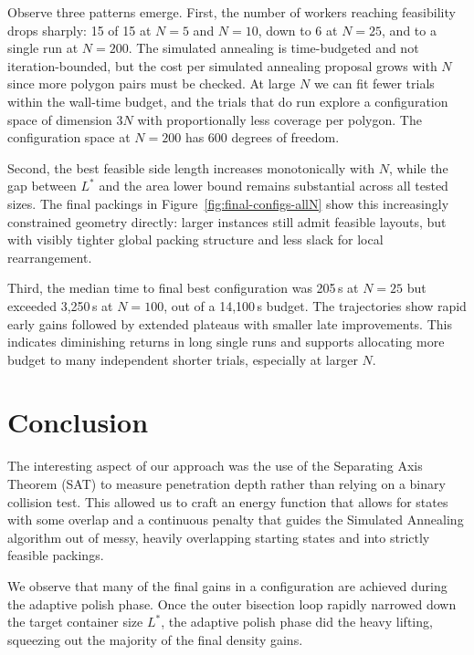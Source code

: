 \documentclass[10pt]{article}
\begin{document}
Observe three patterns emerge. First, the number of workers reaching
feasibility drops sharply: 15 of 15 at $N = 5$ and $N = 10$, down to
6 at $N = 25$, and to a single run at $N = 200$. The simulated annealing is
time-budgeted and not iteration-bounded, but the cost per simulated annealing proposal
grows with $N$ since more polygon pairs must be checked. At large
$N$ we can fit fewer trials within the wall-time budget, and the trials that
do run explore a configuration space of dimension $3N$ with
proportionally less coverage per polygon. The configuration space at
$N = 200$ has 600 degrees of freedom.

Second, the best feasible side length increases monotonically with
$N$, while the gap between $L^*$ and the area lower bound remains substantial across all tested
sizes. The final packings in Figure~\ref{fig:final-configs-allN}
show this increasingly constrained geometry directly: larger instances
still admit feasible layouts, but with visibly tighter global packing
structure and less slack for local rearrangement.

Third, the median time to final best configuration was 205\,s at
$N = 25$ but exceeded 3{,}250\,s at $N = 100$, out of a 14{,}100\,s
budget. The trajectories show rapid early gains followed by extended
plateaus with smaller late improvements. This indicates diminishing
returns in long single runs and supports allocating more budget to many
independent shorter trials, especially at larger $N$.


\clearpage

\section{Conclusion}
\label{sec:conclusion}

The interesting aspect of our approach was the use of 
the Separating Axis Theorem (SAT) to measure penetration depth rather
than relying on a binary collision test. This allowed us to craft an energy
function that allows for states with some overlap and a continuous penalty that guides the
Simulated Annealing algorithm out of messy, heavily overlapping
starting states and into strictly feasible packings. 

We observe that many of the final gains in a configuration are achieved during the adaptive polish phase. 
Once the outer
bisection loop rapidly narrowed down the target container size $L^*$,
the adaptive polish phase did the heavy lifting, squeezing out the
majority of the final density gains.
\end{document}
